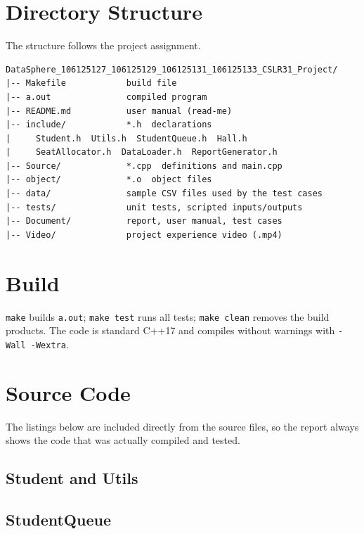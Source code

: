 \documentclass[12pt,a4paper]{report}
\begin{document}
\section{Directory Structure}
The structure follows the project assignment.
\begin{verbatim}
DataSphere_106125127_106125129_106125131_106125133_CSLR31_Project/
|-- Makefile            build file
|-- a.out               compiled program
|-- README.md           user manual (read-me)
|-- include/            *.h  declarations
|     Student.h  Utils.h  StudentQueue.h  Hall.h
|     SeatAllocator.h  DataLoader.h  ReportGenerator.h
|-- Source/             *.cpp  definitions and main.cpp
|-- object/             *.o  object files
|-- data/               sample CSV files used by the test cases
|-- tests/              unit tests, scripted inputs/outputs
|-- Document/           report, user manual, test cases
|-- Video/              project experience video (.mp4)
\end{verbatim}

\section{Build}
\texttt{make} builds \texttt{a.out}; \texttt{make test} runs all tests; \texttt{make clean} removes the build products. The code is standard C++17 and compiles without warnings with \texttt{-Wall -Wextra}.

\section{Source Code}
The listings below are included directly from the source files, so the report always shows the code that was actually compiled and tested.

\subsection{Student and Utils}




\subsection{StudentQueue}


\end{document}
